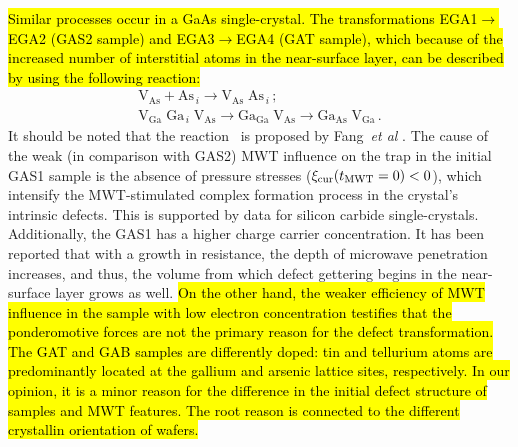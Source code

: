 \documentclass[10pt]{iopart}
\begin{document}
%

\hl{Similar processes occur in a GaAs single-crystal.
The transformations EGA1$\rightarrow$EGA2 (GAS2 sample)
and  EGA3$\rightarrow$EGA4 (GAT sample), which
because of the increased number of interstitial atoms in the near-surface layer,
can be described  by using the following reaction:}
\begin{eqnarray}
  \label{eqGA12}
  \mathrm{V}_\mathrm{As}+ \mathrm{As}_{\,i} \rightarrow \mathrm{V}_\mathrm{As}\;\mathrm{As}_{\,i}\,;\\
  \label{eqGA34}
  \mathrm{V}_\mathrm{Ga}\;\mathrm{Ga}_{\,i}\;\mathrm{V}_\mathrm{As}\rightarrow \mathrm{Ga}_\mathrm{Ga}\;\mathrm{V}_\mathrm{As}
  \rightarrow \mathrm{Ga}_\mathrm{As}\;\mathrm{V}_\mathrm{Ga}\,.
\end{eqnarray}
It should be noted that the reaction~ is proposed by Fang~\emph{et al} \cite{FANG1990}.
The cause of the weak (in comparison with GAS2) MWT influence on the trap in the initial GAS1 sample is
the absence of pressure stresses ($\xi_\mathrm{cur}(t_{\rm MWT}=0)<0$),
which intensify the MWT-stimulated complex formation process in the crystal’s intrinsic defects.
This is supported by data for silicon carbide single-crystals.
Additionally, the GAS1 has a higher charge carrier concentration.
It has been reported \cite{ZOHM2000} that with a growth in resistance, the depth of microwave penetration increases,
and thus, the volume from which defect gettering begins in the near-surface layer grows as well.
\hl{On the other hand, the weaker efficiency of MWT influence in the sample
with low electron concentration testifies that
the ponderomotive forces are not the primary reason for the defect transformation.
The GAT and GAB samples are differently doped:
tin and tellurium atoms are predominantly located at the gallium and arsenic lattice sites, respectively.
In our opinion, it is a minor reason for the difference in the initial defect structure of samples and MWT features.
The root reason is connected to the different crystallin orientation of wafers.}
\end{document}
